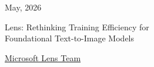\documentclass[11pt]{article}
\begin{document}
\thispagestyle{empty}

\noindent
\begin{minipage}[c]{0.5\linewidth}
\raggedright
\raisebox{-0.5\height}{\msftbrandmark}
\end{minipage}
\begin{minipage}[c]{0.49\linewidth}
\raggedleft
{\msftdatefont\small\color{msftgray}May, 2026}    %
\end{minipage}\par
\vspace{0.35em}
\noindent{\color{msftline}\rule{\linewidth}{0.8pt}\par}

\vspace{1.0em}
\begin{center}
{{\msfttitlefont\fontsize{21}{25}\selectfont\color{msftdark}
Lens: Rethinking Training Efficiency for \\Foundational Text-to-Image Models\par}}                         %
\vspace{1.25em}




{\normalsize\rmfamily\color{msftdark}
\hyperref[sec:contributor]{Microsoft Lens Team}\par



}

\end{center}
\end{document}
